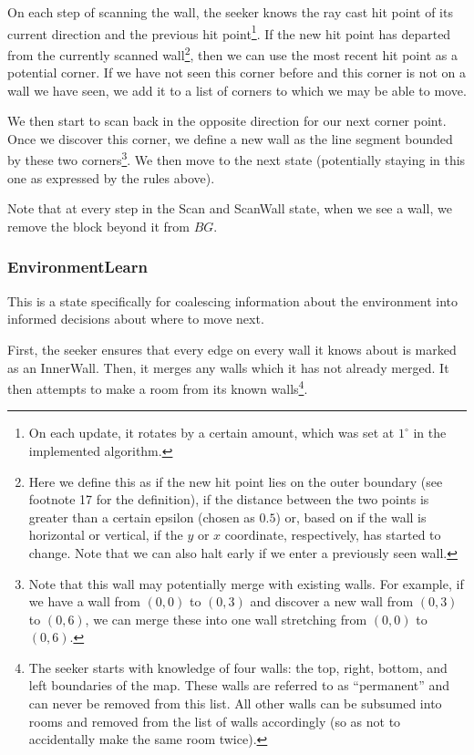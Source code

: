 \documentclass[12pt]{article}
\begin{document}
On each step of scanning the wall, the seeker knows the ray cast hit point of its current direction and the previous hit point\footnote{On each update, it rotates by a certain amount, which was set at $ 1^{\circ} $ in the implemented algorithm.}. If the new hit point has departed from the currently scanned wall\footnote{Here we define this as if the new hit point lies on the outer boundary (see footnote 17 for the definition), if the distance between the two points is greater than a certain epsilon (chosen as $ 0.5 $) or, based on if the wall is horizontal or vertical, if the $ y $ or $ x $ coordinate, respectively, has started to change. Note that we can also halt early if we enter a previously seen wall.}, then we can use the most recent hit point as a potential corner. If we have not seen this corner before and this corner is not on a wall we have seen, we add it to a list of corners to which we may be able to move.

We then start to scan back in the opposite direction for our next corner point. Once we discover this corner, we define a new wall as the line segment bounded by these two corners\footnote{Note that this wall may potentially merge with existing walls. For example, if we have a wall from $ (0, 0) $ to $ (0, 3) $ and discover a new wall from $ (0, 3) $ to $ (0, 6) $, we can merge these into one wall stretching from $ (0, 0) $ to $ (0, 6) $.}. We then move to the next state (potentially staying in this one as expressed by the rules above). 

Note that at every step in the Scan and ScanWall state, when we see a wall, we remove the block beyond it from $ BG $.

\subsubsection{EnvironmentLearn}

This is a state specifically for coalescing information about the environment into informed decisions about where to move next. 

First, the seeker ensures that every edge on every wall it knows about is marked as an InnerWall. Then, it merges any walls which it has not already merged. It then attempts to make a room from its known walls\footnote{The seeker starts with knowledge of four walls: the top, right, bottom, and left boundaries of the map. These walls are referred to as ``permanent'' and can never be removed from this list. All other walls can be subsumed into rooms and removed from the list of walls accordingly (so as not to accidentally make the same room twice).}.
\end{document}
